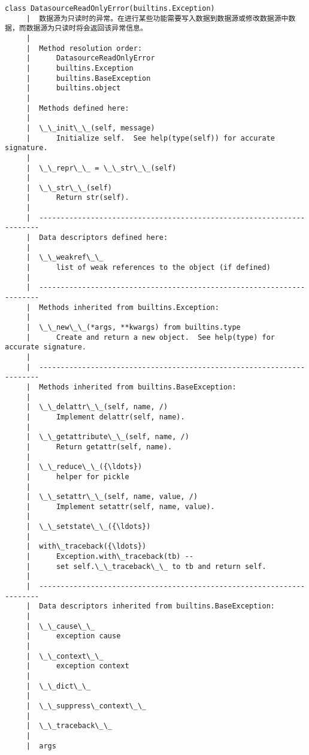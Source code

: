 \documentclass[11pt]{article}
\begin{document}
\begin{Verbatim}[commandchars=\\\{\}]
    class DatasourceReadOnlyError(builtins.Exception)
     |  数据源为只读时的异常。在进行某些功能需要写入数据到数据源或修改数据源中数据，而数据源为只读时将会返回该异常信息。
     |  
     |  Method resolution order:
     |      DatasourceReadOnlyError
     |      builtins.Exception
     |      builtins.BaseException
     |      builtins.object
     |  
     |  Methods defined here:
     |  
     |  \_\_init\_\_(self, message)
     |      Initialize self.  See help(type(self)) for accurate signature.
     |  
     |  \_\_repr\_\_ = \_\_str\_\_(self)
     |  
     |  \_\_str\_\_(self)
     |      Return str(self).
     |  
     |  ----------------------------------------------------------------------
     |  Data descriptors defined here:
     |  
     |  \_\_weakref\_\_
     |      list of weak references to the object (if defined)
     |  
     |  ----------------------------------------------------------------------
     |  Methods inherited from builtins.Exception:
     |  
     |  \_\_new\_\_(*args, **kwargs) from builtins.type
     |      Create and return a new object.  See help(type) for accurate signature.
     |  
     |  ----------------------------------------------------------------------
     |  Methods inherited from builtins.BaseException:
     |  
     |  \_\_delattr\_\_(self, name, /)
     |      Implement delattr(self, name).
     |  
     |  \_\_getattribute\_\_(self, name, /)
     |      Return getattr(self, name).
     |  
     |  \_\_reduce\_\_({\ldots})
     |      helper for pickle
     |  
     |  \_\_setattr\_\_(self, name, value, /)
     |      Implement setattr(self, name, value).
     |  
     |  \_\_setstate\_\_({\ldots})
     |  
     |  with\_traceback({\ldots})
     |      Exception.with\_traceback(tb) --
     |      set self.\_\_traceback\_\_ to tb and return self.
     |  
     |  ----------------------------------------------------------------------
     |  Data descriptors inherited from builtins.BaseException:
     |  
     |  \_\_cause\_\_
     |      exception cause
     |  
     |  \_\_context\_\_
     |      exception context
     |  
     |  \_\_dict\_\_
     |  
     |  \_\_suppress\_context\_\_
     |  
     |  \_\_traceback\_\_
     |  
     |  args
    

\end{Verbatim}
\end{document}
